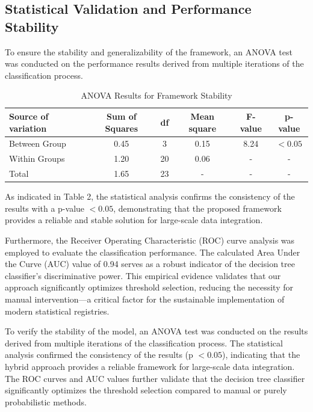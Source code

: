 \documentclass[twoside]{article}
\begin{document}
\subsection{Statistical Validation and Performance Stability}
To ensure the stability and generalizability of the framework, an ANOVA test was conducted on the performance results derived from multiple iterations of the classification process.
	\begin{table}[!ht]
		\centering
		\caption{ANOVA Results for Framework Stability}
		\label{Table 2:ANOVA}
		\begin{tabular}{|l|c|c|c|c|c|}
			\hline
			Source of variation & Sum of Squares & df & Mean square & F-value & p-value \\ \hline
			Between Group       & 0.45           & 3  & 0.15        & 8.24    & $<0.05$ \\ \hline
			Within Groups       & 1.20           & 20 & 0.06        & -      &   -  \\ \hline
			Total               & 1.65           & 23 & -           & -      &   -   \\ \hline
			
		\end{tabular}

		\bigskip
		\noindent As indicated in Table 2, the statistical analysis confirms the consistency of the results with a p-value  $< 0.05$, demonstrating that the proposed framework provides a reliable and stable solution for large-scale data integration.
	\end{table}

Furthermore, the Receiver Operating Characteristic (ROC) curve analysis was employed to evaluate the classification performance. The calculated Area Under the Curve (AUC) value of 0.94 serves as a robust indicator of the decision tree classifier’s discriminative power. This empirical evidence validates that our approach significantly optimizes threshold selection, reducing the necessity for manual intervention—a critical factor for the sustainable implementation of modern statistical registries.

To verify the stability of the model, an ANOVA test was conducted on the results derived from multiple iterations of the classification process. The statistical analysis confirmed the consistency of the results (p $< 0.05$), indicating that the hybrid approach provides a reliable framework for large-scale data integration. The ROC curves and AUC values further validate that the decision tree classifier significantly optimizes the threshold selection compared to manual or purely probabilistic methods.
\end{document}
